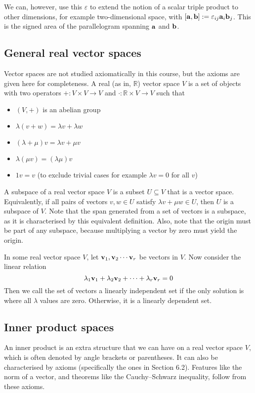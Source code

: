 We can, however, use this \(\varepsilon\) to extend the notion of a scalar triple product to other dimensions, for example two-dimensional space, with \([\vb a, \vb b] := \varepsilon_{ij} \vb a_i \vb b_j\).
This is the signed area of the parallelogram spanning \(\vb a\) and \(\vb b\).

\subsection{General real vector spaces}
Vector spaces are not studied axiomatically in this course, but the axioms are given here for completeness.
A real (as in, \(\mathbb R\)) vector space \(V\) is a set of objects with two operators \(+: V \times V \to V\) and \(\cdot: \mathbb R \times V \to V\) such that
\begin{itemize}
	\item \((V, +)\) is an abelian group
	\item \(\lambda(v + w) = \lambda v + \lambda w\)
	\item \((\lambda + \mu)v = \lambda v + \mu v\)
	\item \(\lambda(\mu v) = (\lambda \mu) v\)
	\item \(1v = v\) (to exclude trivial cases for example \(\lambda v = 0\) for all \(v\))
\end{itemize}

A subspace of a real vector space \(V\) is a subset \(U \subseteq V\) that is a vector space.
Equivalently, if all pairs of vectors \(v, w \in U\) satisfy \(\lambda v + \mu w \in U\), then \(U\) is a subspace of \(V\).
Note that the span generated from a set of vectors is a subspace, as it is characterised by this equivalent definition.
Also, note that the origin must be part of any subspace, because multiplying a vector by zero must yield the origin.

In some real vector space \(V\), let \(\vb v_1, \vb v_2 \cdots \vb v_r\) be vectors in \(V\).
Now consider the linear relation
\[
	\lambda_1 \vb v_1 + \lambda_2 \vb v_2 + \cdots + \lambda_r \vb v_r = 0
\]
Then we call the set of vectors a linearly independent set if the only solution is where all \(\lambda\) values are zero.
Otherwise, it is a linearly dependent set.

\subsection{Inner product spaces}
An inner product is an extra structure that we can have on a real vector space \(V\), which is often denoted by angle brackets or parentheses.
It can also be characterised by axioms (specifically the ones in Section 6.2).
Features like the norm of a vector, and theorems like the Cauchy--Schwarz inequality, follow from these axioms.


